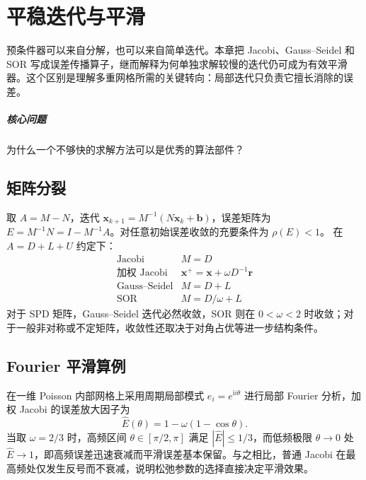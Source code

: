 \chapter{平稳迭代与平滑}\label{v0ch:17}
\begin{chaptersummary}
预条件器可以来自分解，也可以来自简单迭代。本章把 Jacobi、Gauss–Seidel 和 SOR 写成误差传播算子，继而解释为何单独求解较慢的迭代仍可成为有效平滑器。这个区别是理解多重网格所需的关键转向：局部迭代只负责它擅长消除的误差。
\end{chaptersummary}
\paragraph{核心问题}为什么一个不够快的求解方法可以是优秀的算法部件？

\section{矩阵分裂}
取 $A=M-N$，迭代
$\bm x_{k+1}=M^{-1}(N\bm x_k+\bm b)$，误差矩阵为
$E=M^{-1}N=I-M^{-1}A$。对任意初始误差收敛的充要条件为 $\rho(E)<1$。
在 $A=D+L+U$ 约定下：
\[
\begin{array}{c|c}
\text{Jacobi}&M=D\\
\text{加权 Jacobi}&\bm x^+=\bm x+\omega D^{-1}\bm r\\
\text{Gauss--Seidel}&M=D+L\\
\text{SOR}&M=D/\omega+L
\end{array}
\]
对于 SPD 矩阵，Gauss--Seidel 迭代必然收敛，SOR 则在 $0<\omega<2$ 时收敛；对于一般非对称或不定矩阵，收敛性还取决于对角占优等进一步结构条件。
\section{Fourier 平滑算例}
在一维 Poisson 内部网格上采用周期局部模式 $e_i=e^{\mathrm i i\theta}$ 进行局部 Fourier 分析，加权 Jacobi 的误差放大因子为
\[
 \widehat E(\theta)=1-\omega(1-\cos\theta).
\]
当取 $\omega=2/3$ 时，高频区间 $\theta\in[\pi/2,\pi]$ 满足 $|\widehat E|\le1/3$，而低频极限 $\theta\to0$ 处 $\widehat E\to1$，即高频误差迅速衰减而平滑误差基本保留。与之相比，普通 Jacobi 在最高频处仅发生反号而不衰减，说明松弛参数的选择直接决定平滑效果。

